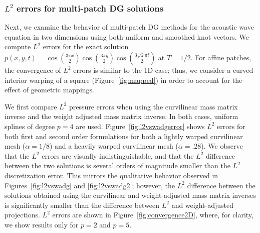 \documentclass[preprint,10pt]{elsarticle}
\newcommand{\LRp}[1]{\left( #1 \right)}
\newcommand{\reviewerTwo}[1]{#1}
\begin{document}
\subsubsection{$L^2$ errors for multi-patch DG solutions }

Next, we examine the behavior of multi-patch DG methods for the acoustic wave equation in two dimensions using both uniform and smoothed knot vectors.  We compute $L^2$ errors for the exact solution $p(x,y,t) = \cos\LRp{\frac{3\pi x}{2}}\cos\LRp{\frac{3\pi y}{2}}\cos\LRp{\frac{3\sqrt{2} \pi t}{2}}$ at $T = 1/2$.  For affine patches, the convergence of $L^2$ errors is similar to the 1D case; thus, we consider a curved interior warping of a square (Figure~\ref{fig:mapped}) in order to account for the effect of geometric mappings.  

\reviewerTwo{We first compare $L^2$ pressure errors when using the curvilinear mass matrix inverse and the weight adjusted mass matrix inverse.  In both cases, uniform splines of degree $p=4$ are used.  Figure~\ref{fig:l2vswadgerror} shows $L^2$ errors for both first and second order formulations for both a lightly warped curvilinear mesh ($\alpha = 1/8$) and a heavily warped curvilinear mesh ($\alpha = .28$).   We observe that the $L^2$ errors are visually indistinguishable, and that the $L^2$ difference between the two solutions is several orders of magnitude smaller than the $L^2$ discretization error.  This mirrors the qualitative behavior observed in Figures~\ref{fig:l2vswadg} and \ref{fig:l2vswadg2}; however, the $L^2$ difference between the solutions obtained using the curvilinear and weight-adjusted mass matrix inverses is significantly smaller than the difference between $L^2$ and weight-adjusted projections. }  $L^2$ errors are shown in Figure~\ref{fig:convergence2D}, where, for clarity, we show results only for $p=2$ and $p=5$.  
\end{document}
